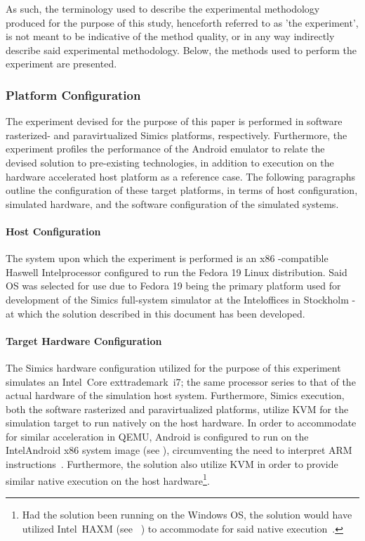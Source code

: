 As such, the terminology used to describe the experimental methodology produced for the purpose of this study, henceforth referred to as 'the experiment', is not meant to be indicative of the method quality, or in any way indirectly describe said experimental methodology.
Below, the methods used to perform the experiment are presented.

\subsubsection{Platform Configuration}
\label{sec:experimentalmethodology_platformconfiguration}
The experiment devised for the purpose of this paper is performed in software rasterized- and paravirtualized Simics platforms, respectively.
Furthermore, the experiment profiles the performance of the Android emulator to relate the devised solution to pre-existing technologies, in addition to execution on the hardware accelerated host platform as a reference case.
The following paragraphs outline the configuration of these target platforms, in terms of host configuration, simulated hardware, and the software configuration of the simulated systems.

\paragraph{Host Configuration}
\label{par:experimentalmethodology_platformconfiguration_hostconfiguration}
The system upon which the experiment is performed is an x86 -compatible Haswell Intel\circledR processor configured to run the Fedora 19 Linux distribution.
Said OS was selected for use due to Fedora 19 being the primary platform used for development of the Simics full-system simulator at the Intel\circledR offices in Stockholm - at which the solution described in this document has been developed.

\paragraph{Target Hardware Configuration}
\label{par:experimentalmethodology_platformconfiguration:targethardwareconfiguration}
The Simics hardware configuration utilized for the purpose of this experiment simulates an Intel\circledR\ Core	exttrademark\ i7; the same processor series to that of the actual hardware of the simulation host system.
Furthermore, Simics execution, both the software rasterized and paravirtualized platforms, utilize KVM for the simulation target to run natively on the host hardware.
In order to accommodate for similar acceleration in QEMU, Android is configured to run on the Intel\circledR Android x86 system image (see ), circumventing the need to interpret ARM instructions~.
Furthermore, the solution also utilize KVM in order to provide similar native execution on the host hardware\footnote{Had the solution been running on the Windows OS, the solution would have utilized Intel\circledR\ HAXM (see ~) to accommodate for said native execution~.}.

